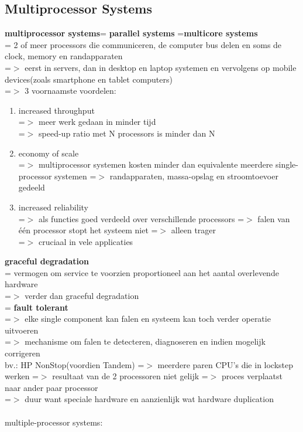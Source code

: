 \documentclass{report}
\begin{document}
\subsection{Multiprocessor Systems}
\textbf{multiprocessor systems}= \textbf{parallel systems} =\textbf{multicore systems}
\\= 2 of meer processors die communiceren, de computer bus delen en soms de clock, memory en randapparaten
\\=$>$ eerst in servers, dan in desktop en laptop systemen en vervolgens op mobile devices(zoals smartphone en tablet computers)
\\=$>$ 3 voornaamste voordelen:
\begin{enumerate}
\item increased throughput
\\=$>$ meer werk gedaan in minder tijd
\\=$>$ speed-up ratio met N processors is minder dan N
\item economy of scale
\\=$>$ multiprocessor systemen kosten minder dan equivalente meerdere single-processor systemen =$>$ randapparaten, massa-opslag en stroomtoevoer gedeeld 
\item increased reliability
\\=$>$ als functies goed verdeeld over verschillende processors =$>$ falen van \'e\'en processor stopt het systeem niet =$>$ alleen trager
\\=$>$ cruciaal in vele applicaties
\end{enumerate}
\textbf{graceful degradation}
\\= vermogen om service te voorzien proportioneel aan het aantal overlevende hardware
\\=$>$ verder dan graceful degradation 
\\= \textbf{fault tolerant}
\\=$>$ elke single component kan falen en systeem kan toch verder operatie uitvoeren
\\=$>$ mechanisme om falen te detecteren, diagnoseren en indien mogelijk corrigeren
\\bv.: HP NonStop(voordien Tandem) =$>$ meerdere paren CPU's die in lockstep werken =$>$ resultaat van de 2 processoren niet gelijk =$>$ proces verplaatst naar ander paar processor 
\\ =$>$ duur want speciale hardware en aanzienlijk wat hardware duplication
\\
\\ multiple-processor systems:
\end{document}
